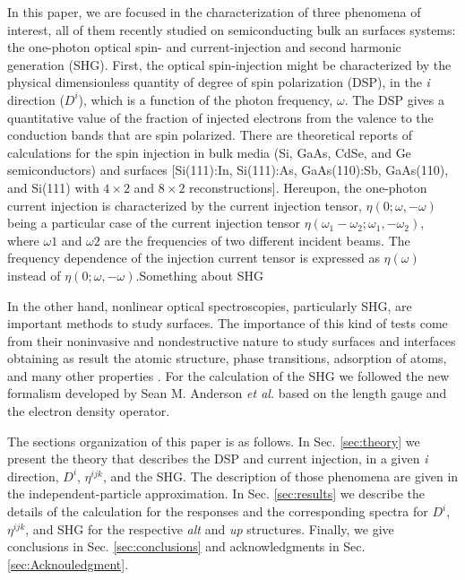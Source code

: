 \documentclass[twocolumn,aps,pra,11pt,tightenlines,showpacs,superscriptaddress,groupedaddress]{revtex4-1}
\begin{document}
In this paper, we are focused in the characterization of three phenomena of interest, all of them recently studied on semiconducting bulk an surfaces systems: the one-photon optical spin- and current-injection and  second harmonic generation (SHG). First, the optical spin-injection might be characterized by the physical dimensionless quantity of degree of spin polarization (DSP), in the \emph{i} direction ($D^{i}$), which is a function of the photon frequency, $\omega$. The DSP gives a quantitative value of the fraction of injected electrons from the valence to the conduction bands that are spin polarized. There are theoretical reports of calculations for the spin injection in bulk media  (Si, GaAs, CdSe, and Ge semiconductors) \cite{nastos2007full,cabellos2009stress,rioux2010optical} and surfaces  [Si(111):In, Si(111):As, GaAs(110):Sb, GaAs(110), and Si(111) with $4\times2$ and $8\times2$ reconstructions]\cite{mendoza2012optical,arzate2014optical}. Hereupon, the one-photon current injection is characterized by the current injection tensor, $\eta(0;\omega,-\omega)$  being a particular case of the current injection tensor $\eta(\omega_{1}-\omega_{2};\omega_{1},-\omega_{2})$, where $\omega{1}$ and $\omega{2}$ are the frequencies of two different incident beams. The frequency dependence of the injection current tensor is expressed as $\eta(\omega)$ instead of $\eta(0;\omega,-\omega)$.{\huge Something about SHG}

In the other hand, nonlinear optical spectroscopies, particularly SHG, are important methods to study surfaces. The importance of this kind of tests come from their noninvasive and nondestructive nature to study surfaces and interfaces obtaining as result the atomic structure, phase transitions, adsorption of atoms, and many other properties \cite{dadap1997second,daum1993identification,mcgilp1994probing,power1995resonant,godefroy1996electric,salazar2014molecular,chen1981surface,mendoza1998microscopic}. For the calculation of the SHG we followed the new formalism developed by Sean M. Anderson \emph{et al.}  \cite{anderson2015theory} based on the length gauge and the electron density operator.



The sections organization of this paper is as follows. In Sec. \ref{sec:theory} we present the theory that describes the DSP and current injection, in a given \emph{i} direction, $D^{i}$, $\eta^{ijk}$, and the SHG. The description of those phenomena are given in the independent-particle approximation. In Sec. \ref{sec:results} we describe the details of the calculation for the responses and the corresponding spectra for  $D^{i}$, $\eta^{ijk}$, and SHG for the respective \emph{alt} and \emph{up} structures. Finally, we give conclusions in Sec. \ref{sec:conclusions} and acknowledgments in Sec. \ref{sec:Acknouledgment}.
\end{document}

